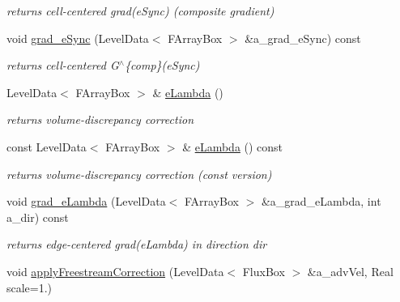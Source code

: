 \begin{DoxyCompactItemize}
\begin{DoxyCompactList}\small\item\em returns cell-\/centered grad(e\-Sync) (composite gradient) \end{DoxyCompactList}\item 
\hypertarget{class_c_c_projector_adace61bd91737f6412492472a8a8c569}{void \hyperlink{class_c_c_projector_adace61bd91737f6412492472a8a8c569}{grad\-\_\-e\-Sync} (Level\-Data$<$ F\-Array\-Box $>$ \&a\-\_\-grad\-\_\-e\-Sync) const }\label{class_c_c_projector_adace61bd91737f6412492472a8a8c569}

\begin{DoxyCompactList}\small\item\em returns cell-\/centered G$^\wedge$\{comp\}(e\-Sync) \end{DoxyCompactList}\item 
\hypertarget{class_c_c_projector_af6958ec09330ba57f6cd304eddc6eeef}{Level\-Data$<$ F\-Array\-Box $>$ \& \hyperlink{class_c_c_projector_af6958ec09330ba57f6cd304eddc6eeef}{e\-Lambda} ()}\label{class_c_c_projector_af6958ec09330ba57f6cd304eddc6eeef}

\begin{DoxyCompactList}\small\item\em returns volume-\/discrepancy correction \end{DoxyCompactList}\item 
\hypertarget{class_c_c_projector_a6e659129f1e178e62c0c03c315c77189}{const Level\-Data$<$ F\-Array\-Box $>$ \& \hyperlink{class_c_c_projector_a6e659129f1e178e62c0c03c315c77189}{e\-Lambda} () const }\label{class_c_c_projector_a6e659129f1e178e62c0c03c315c77189}

\begin{DoxyCompactList}\small\item\em returns volume-\/discrepancy correction (const version) \end{DoxyCompactList}\item 
\hypertarget{class_c_c_projector_ad1fb6f86ffaa237ccedd8837c6158b7a}{void \hyperlink{class_c_c_projector_ad1fb6f86ffaa237ccedd8837c6158b7a}{grad\-\_\-e\-Lambda} (Level\-Data$<$ F\-Array\-Box $>$ \&a\-\_\-grad\-\_\-e\-Lambda, int a\-\_\-dir) const }\label{class_c_c_projector_ad1fb6f86ffaa237ccedd8837c6158b7a}

\begin{DoxyCompactList}\small\item\em returns edge-\/centered grad(e\-Lambda) in direction dir \end{DoxyCompactList}\item 
\hypertarget{class_c_c_projector_a55be8a48dc945b23e8ee08dd50d9e585}{void \hyperlink{class_c_c_projector_a55be8a48dc945b23e8ee08dd50d9e585}{apply\-Freestream\-Correction} (Level\-Data$<$ Flux\-Box $>$ \&a\-\_\-adv\-Vel, Real scale=1.)}\label{class_c_c_projector_a55be8a48dc945b23e8ee08dd50d9e585}


\end{DoxyCompactItemize}
